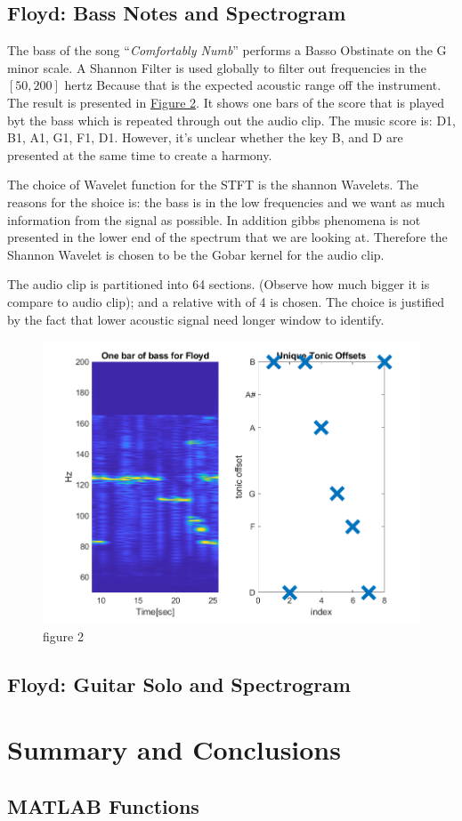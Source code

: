\documentclass{article}
\begin{document}
    \subsection{Floyd: Bass Notes and Spectrogram}
        \par\hspace{1.1em}
        The bass of the song ``\textit{Comfortably Numb}'' performs a Basso Obstinate on the G minor scale. A Shannon Filter is used globally to filter out frequencies in the $[50, 200]$ hertz Because that is the expected acoustic range off the instrument. The result is presented in \hyperref[fig:2]{Figure 2}. It shows one bars of the score that is played byt the bass which is repeated through out the audio clip. The music score is: 
        D1, B1, A1, G1, F1, D1. However, it's unclear whether the key B, and D are presented at the same time to create a harmony. 
        \par
        The choice of Wavelet function for the STFT is the shannon Wavelets. The reasons for the shoice is: the bass is in the low frequencies and we want as much information from the signal as possible. In addition gibbs phenomena is not presented in the lower end of the spectrum that we are looking at. Therefore the Shannon Wavelet is chosen to be the Gobar kernel for the audio clip.
        \par
        The audio clip is partitioned into 64 sections. (Observe how much bigger it is compare to audio clip); and a relative with of 4 is chosen. The choice is justified by the fact that lower acoustic signal need longer window to identify. 
        \begin{figure}[h]
            \centering
            \includegraphics*[width=0.7\linewidth]{floyd-bass-spectro.png}
            \caption{figure 2}
            \label{fig:2}
        \end{figure}
    \subsection{Floyd: Guitar Solo and Spectrogram}
        
    
    



\section{Summary and Conclusions}
   
\printbibliography

\begin{appendices}

\section{MATLAB Functions}

    
\end{appendices}
\end{document}
